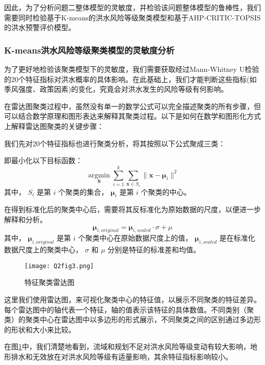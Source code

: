 \documentclass[withoutpreface,bwprint]{cumcmthesis} %
\begin{document}
因此，为了分析问题二整体模型的灵敏度，并检验该问题整体模型的鲁棒性，我们需要同时检验基于K-means的洪水风险等级聚类模型和基于AHP-CRITIC-TOPSIS的洪水预警评价模型。

\subsubsection{K-means洪水风险等级聚类模型的灵敏度分析}
为了更好地检验该聚类模型下的灵敏度，我们需要获取经过Mann-Whitney U检验的20个特征指标对洪水概率的具体影响。在此基础上，我们才能判断这些指标(如季风强度、政策因素)的变化，究竟会对洪水发生的风险等级有何影响。

在雷达图聚类过程中，虽然没有单一的数学公式可以完全描述聚类的所有步骤，但可以结合数学原理和图形表达来解释其聚类过程。以下是如何在数学和图形化方式上解释雷达图聚类的关键步骤：

我们先对20个特征指标也进行聚类分析，将其按照以下公式聚成三类：

即最小化以下目标函数：
\begin{equation}
\underset{\mathbf{S}}{\operatorname{argmin}} \sum_{i=1}^{k} \sum_{\mathbf{x} \in S_i} \|\mathbf{x} - \mathbf{\mu}_i\|^2
\end{equation}
其中， \( S_i \) 是第 \( i \) 个聚类的集合， \( \mathbf{\mu}_i \) 是第 \( i \) 个聚类的中心。

在得到标准化后的聚类中心后，需要将其反标准化为原始数据的尺度，以便进一步解释和分析。
\begin{equation}
\mathbf{\mu}_{i, original} = \mathbf{\mu}_{i, scaled} \cdot \sigma + \mu
\end{equation}
其中， \( \mathbf{\mu}_{i, original} \) 是第 \( i \) 个聚类中心在原始数据尺度上的值， \( \mathbf{\mu}_{i, scaled} \) 是在标准化数据尺度上的聚类中心， \( \sigma \) 和 \( \mu \) 分别是特征的标准差和均值。

\begin{figure}[htbp]
	\centering
	\texttt{[image: Q2fig3.png]}
	\caption{特征聚类雷达图}
	\label{Q2fig3.png}
\end{figure}

这里我们使用雷达图，来可视化聚类中心的特征值，以展示不同聚类的特征差异。每个雷达图中的轴代表一个特征，轴的值表示该特征的具体数值。不同类别（聚类）的聚类中心在雷达图中以多边形的形式展示，不同聚类之间的区别通过多边形的形状和大小来比较。

在图\ref{Q2fig3.png}中，我们清楚地看到，流域和规划不足对洪水风险等级变动有较大影响，地形排水和无效放在对洪水风险等级有适量影响，其余特征指标影响较小。
\end{document}

